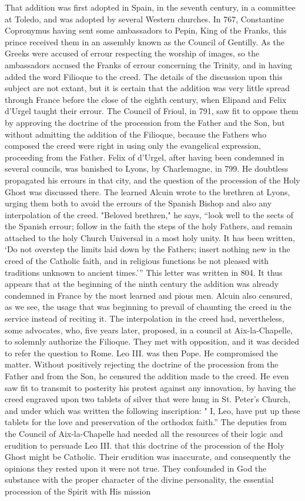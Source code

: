 That addition was first adopted in Spain, in the seventh century, in a committee at Toledo, and was adopted by several Western churches. In 767, Constantine Copronymus having sent some ambassadors to Pepin, King of the Franks, this prince received them in an assembly known as the Council of Gentilly. As the Greeks were accused of errour respecting the worship of images, so the ambassadors accused the Franks of errour concerning the Trinity, and in having added the word Filioque to the creed. The details of the discussion upon this subject are not extant, but it is certain that the addition was very little spread through France before the close of the eighth century, when Elipand and Felix d'Urgel taught their errour. The Council of Frioul, in 791, saw fit to oppose them by approving the doctrine of the procession from the Father and the Son, but without admitting the addition of the Filioque, because the Fathers who composed the creed were right in using only the evangelical expression, proceeding from the Father. Felix of d’Urgel, after having been condemned in several councils, was banished to Lyons, by Charlemagne, in 799. He doubtless propagated his errours in that city, and the question of the procession of the Holy Ghost was discussed there. The learned Alcuin wrote to the brethren at Lyons, urging them both to avoid the errours of the Spanish Bishop and also any interpolation of the creed. "Beloved brethren," he says, “look well to the sects of the Spanish errour; follow in the faith the steps of the holy Fathers, and remain attached to the holy Church Universal in a most holy unity. It has been written, ‘Do not overstep the limits laid down by the Fathers; insert nothing new in the creed of the Catholic faith, and in religious functions be not pleased with traditions unknown to ancient times.’” This letter was written in 804. It thus appears that at the beginning of the ninth century the addition was already condemned in France by the most learned and pious men. Alcuin also censured, as we see, the usage that was beginning to prevail of chaunting the creed in the service instead of reciting it. The interpolation in the creed had, nevertheless, some advocates, who, five years later, proposed, in a council at Aix-la-Chapelle, to solemnly authorize the Filioque. They met with opposition, and it was decided to refer the question to Rome. Leo III. was then Pope. He compromised the matter. Without positively rejecting the doctrine of the procession from the Father and from the Son, he censured the addition made to the creed. He even saw fit to transmit to posterity his protest against any innovation, by having the creed engraved upon two tablets of silver that were hung in St. Peter's Church, and under which was written the following inscription: " I, Leo, have put up these tablets for the love and preservation of the orthodox faith.” The deputies from the Council of Aix-la-Chapelle had needed all the resources of their logic and erudition to persuade Leo III. that this doctrine of the procession of the Holy Ghost might be Catholic. Their erudition was inaccurate, and consequently the opinions they rested upon it were not true. They confounded in God the substance with the proper character of the divine personality, the essential procession of the Spirit with His mission 